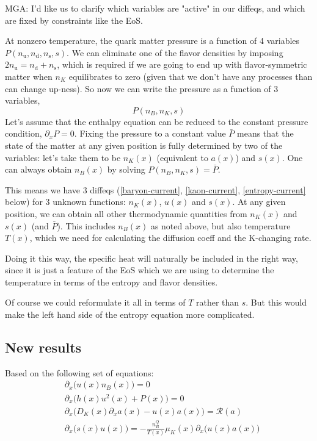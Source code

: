 \documentclass[11pt]{article}
\newcommand{\mga}[1]{{\color[rgb]{0.8,0,0}#1}}
\newcommand{\p}{\partial}
\begin{document}
\bigskip
\mga{
MGA: I'd like us to clarify which variables are "active" in our diffeqs, and which are fixed by constraints like the EoS.

\medskip\noindent
At nonzero temperature, the quark matter pressure is a function of 4 variables
$P(n_\text{u},n_\text{d},n_\text{s},s)$.
We can eliminate one of the flavor densities by imposing $2n_\text{u}=n_\text{d}+n_\text{s}$,
which is required if we are going to end up with flavor-symmetric matter when $n_K$ equilibrates to zero (given that we don't have any processes than can change up-ness).  So now we can write the pressure as a function of 3 variables,
\begin{equation}
P(n_B,n_K,s)
\end{equation}
Let's assume that the enthalpy equation can be reduced to the constant pressure condition, $\p_x P=0$. Fixing the pressure to a constant value $\bar P$ means that the state of the matter at any given position is fully determined by two of the variables: let's take them to be $n_K(x)$ (equivalent to $a(x)$) and $s(x)$. One can always obtain $n_B(x)$ by solving $P(n_B,n_K,s)=\bar P$.

\medskip\noindent
This means we have 3 diffeqs (\eqref{baryon-current}, \eqref{kaon-current}, \eqref{entropy-current} below) for 3 unknown functions: $n_K(x)$, $u(x)$ and $s(x)$. At any given position, we can obtain all other thermodynamic quantities from $n_K(x)$ and $s(x)$ (and $\bar P$). This includes $n_B(x)$ as noted above, but also temperature $T(x)$, which we need for calculating the diffusion coeff and the K-changing rate.

\medskip\noindent
Doing it this way, the specific heat will naturally be included in the right way, since it is just a feature of the EoS which we are using to determine the temperature in terms of the entropy and flavor densities.

\medskip\noindent
Of course we could reformulate it all in terms of $T$ rather than $s$. But this would make the left hand side of the entropy equation more complicated.
}


\subsection{New results}

Based on the following set of equations:
\begin{align}
& \partial_x\Big(u(x) n_B(x)\Big) = 0 \label{baryon-current}\\
& \partial_x\Big( h(x)u^2(x) + P(x)\Big) = 0 \label{enthalpy-current}\\
& \partial_x\Big( D_K(x)\partial_x a(x) - u(x)a(x)\Big) = \mathcal{R}(a) \label{kaon-current}\\
& \partial_x\Big(s(x)u(x)\Big) = -\frac{n_B^Q}{T(x)}\mu_K(x)\partial_x\Big(u(x) a(x)\Big) \label{entropy-current}
\end{align}
\end{document}

